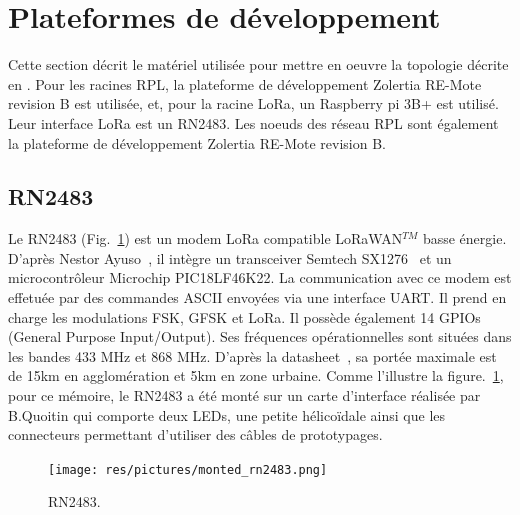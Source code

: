 \section{Plateformes de développement}\label{hardware}
\renewcommand{\rightmark}{Plateformes de développement}
    Cette section décrit le matériel utilisée pour mettre en oeuvre la topologie décrite en . Pour les racines RPL, la plateforme de développement Zolertia RE-Mote revision B est utilisée, et,  pour la racine LoRa, un Raspberry pi 3B+ est utilisé. Leur interface LoRa est un RN2483. Les noeuds des réseau RPL sont également la plateforme de développement Zolertia RE-Mote revision B.

\subsection*{RN2483}\label{hardware:rn2483}
    Le RN2483 (Fig.~\ref{fig:state-rn2483}) est un modem LoRa compatible LoRaWAN$^{TM}$ basse énergie. D'après Nestor Ayuso~\cite{ayuso_2015}, il intègre un transceiver Semtech SX1276~\cite{sx1276:datasheet} et un microcontrôleur Microchip PIC18LF46K22.
    La communication avec ce modem est effetuée par des commandes ASCII envoyées via une interface UART. Il prend en charge les modulations FSK, GFSK et LoRa. Il possède également 14 GPIOs (General Purpose Input/Output).
    Ses fréquences opérationnelles sont situées dans les bandes 433 MHz et 868 MHz.
    D'après la datasheet~\cite{rn2483:datasheet}, 
    sa portée maximale est de 15km en agglomération et 5km en zone urbaine. Comme l'illustre la figure.~\ref{fig:state-rn2483}, pour ce mémoire, le RN2483 a été monté sur un carte d'interface réalisée par B.Quoitin qui comporte deux LEDs, une petite hélicoïdale ainsi que les connecteurs permettant d'utiliser des câbles de prototypages.

    \begin{figure}[H]
        \centering
        \texttt{[image: res/pictures/monted\_rn2483.png]}
        \caption{RN2483.}
        \label{fig:state-rn2483}
    \end{figure}

